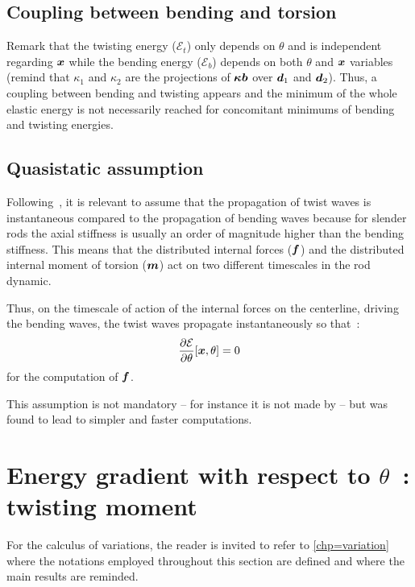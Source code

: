 \subsection{Coupling between bending and torsion}
Remark that the twisting energy ($\mathcal{E}_{t}$) only depends on $\theta$ and is independent regarding $\boldsymbol{x}$ while the bending energy ($\mathcal{E}_{b}$) depends on both $\theta$ and $\boldsymbol{x}$ variables (remind that $\kappa_1$ and $\kappa_2$ are the projections of $\boldsymbol{\kappa b}$ over $\boldsymbol{d}_1$ and $\boldsymbol{d}_2$). Thus, a coupling between bending and twisting appears and the minimum of the whole elastic energy is not necessarily reached for concomitant minimums of bending and twisting energies.

\subsection{Quasistatic assumption}
Following~, it is relevant to assume that the propagation of twist waves is instantaneous compared to the propagation of bending waves because for slender rods the axial stiffness is usually an order of magnitude higher than the bending stiffness. This means that the distributed internal forces ($\boldsymbol{f}$) and the  distributed internal moment of torsion ($\boldsymbol{m}$) act on two different timescales in the rod dynamic.

Thus, on the timescale of action of the internal forces on the centerline, driving the bending waves, the twist waves propagate instantaneously so that~:
\begin{equation}
	\frac{\partial \mathcal{E}}{\partial\theta}[\boldsymbol{x}, \theta]=0
\label{eq:quasistat_hyp}
\end{equation}
for the computation of $\boldsymbol{f}$.

This assumption is not mandatory -- for instance it is not made by  -- but was found to lead to simpler and faster computations.

\section{Energy gradient with respect to $\theta$~: twisting moment}\label{sec=dE_dtheta}

For the calculus of variations, the reader is invited to refer to \cref{chp=variation} where the notations employed throughout this section are defined and where the main results are reminded.

